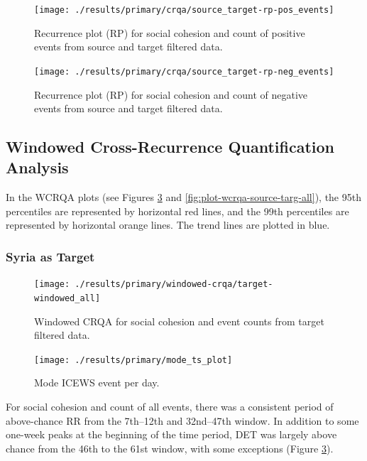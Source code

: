 \documentclass[
  english,
  man]{apa6}
\begin{document}
\begin{figure}
\texttt{[image: ./results/primary/crqa/source\_target-rp-pos\_events]} \caption{Recurrence plot (RP) for social cohesion and count of positive events from source and target filtered data.}\label{fig:plot-rp-source-targ-pos}
\end{figure}

\begin{figure}
\texttt{[image: ./results/primary/crqa/source\_target-rp-neg\_events]} \caption{Recurrence plot (RP) for social cohesion and count of negative events from source and target filtered data.}\label{fig:plot-rp-source-targ-neg}
\end{figure}

\hypertarget{windowed-cross-recurrence-quantification-analysis-1}{%
\subsection{Windowed Cross-Recurrence Quantification Analysis}\label{windowed-cross-recurrence-quantification-analysis-1}}

In the WCRQA plots (see Figures \ref{fig:plot-wcrqa-targ-all} and
\ref{fig:plot-wcrqa-source-targ-all}), the 95th percentiles are represented by
horizontal red lines, and the 99th percentiles are represented by horizontal
orange lines. The trend lines are plotted in blue.

\hypertarget{syria-as-target-1}{%
\subsubsection{Syria as Target}\label{syria-as-target-1}}

\begin{figure}
\texttt{[image: ./results/primary/windowed-crqa/target-windowed\_all]} \caption{Windowed CRQA for social cohesion and event counts from target filtered data.}\label{fig:plot-wcrqa-targ-all}
\end{figure}

\begin{figure}
\texttt{[image: ./results/primary/mode\_ts\_plot]} \caption{Mode ICEWS event per day.}\label{fig:plot-mode-event}
\end{figure}

For social cohesion and count of all events, there was a consistent period of
above-chance RR from the 7th--12th and 32nd--47th window. In addition to some
one-week peaks at the beginning of the time period, DET was largely above chance
from the 46th to the 61st window, with some exceptions (Figure
\ref{fig:plot-wcrqa-targ-all}).
\end{document}
